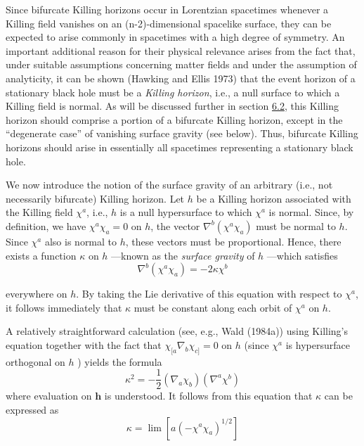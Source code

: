 \documentclass[11pt,a4paper]{article}
\begin{document}
Since bifurcate Killing horizons occur in Lorentzian spacetimes whenever a Killing field vanishes on an (n-2)-dimensional spacelike surface, they can be expected to arise commonly in spacetimes with a high degree of symmetry. An important additional reason for their physical relevance arises from the fact that, under suitable assumptions concerning matter fields and under the assumption of analyticity, it can be shown (Hawking and Ellis 1973) that the event horizon of a stationary black hole must be a \emph{Killing horizon}, i.e., a null surface to which a Killing field is normal. As will be discussed further in section \hyperlink{sec:6.2}{6.2}, this Killing horizon should comprise a portion of a bifurcate Killing horizon, except in the ``degenerate case'' of vanishing surface gravity (see below). Thus, bifurcate Killing horizons should arise in essentially all spacetimes representing a stationary black hole.

We now introduce the notion of the surface gravity of an arbitrary (i.e., not necessarily bifurcate) Killing horizon. Let \(h\) be a \hypertarget{source-134}{} Killing horizon associated with the Killing field \(\chi^a\), i.e., \(h\) is a null hypersurface to which \(\chi^a\) is normal. Since, by definition, we have \(\chi^a\chi_a=0\) on \(h\), the vector \(\nabla^b(\chi^a\chi_a)\) must be normal to \(h\). Since \(\chi^a\) also is normal to \(h\), these vectors must be proportional. Hence, there exists a function \(\kappa\) on \(h\) ---known as the \emph{surface gravity} of \(h\) ---which satisfies
\begin{equation*}
\nabla^{b} ( \chi^{a} \chi_{a} ) = -2 \kappa \chi^{b} \tag{5.2.4}\label{eq:5.2.4}
\end{equation*}

everywhere on \(h\). By taking the Lie derivative of this equation with respect to \(\chi^a\), it follows immediately that \(\kappa\) must be constant along each orbit of \(\chi^a\) on \(h\).

A relatively straightforward calculation (see, e.g., Wald (1984a)) using Killing's equation together with the fact that \(\chi_{[a}\nabla_b\chi_{c]}=0\) on \(h\) (since \(\chi^a\) is hypersurface orthogonal on \(h\) ) yields the formula
\begin{equation*}
\kappa^2 = -\frac{1}{2} ( \nabla_a \chi_b ) ( \nabla^a \chi^b ) \tag{5.2.5}\label{eq:5.2.5}
\end{equation*}
where evaluation on \(\pmb{h}\) is understood. It follows from this equation that \(\kappa\) can be expressed as
\begin{equation*}
\kappa = \lim [ a(-\chi^a \chi_a)^{1/2} ] \tag{5.2.6}\label{eq:5.2.6}
\end{equation*}
\end{document}
